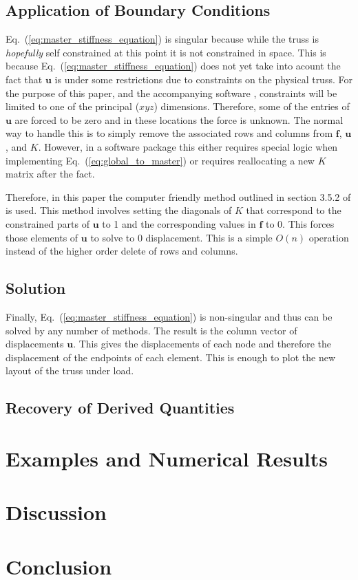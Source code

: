 \documentclass{article}
\begin{document}
\subsection{Application of Boundary Conditions}

Eq.~(\ref{eq:master_stiffness_equation}) is singular because while the truss
is \emph{hopefully} self constrained at this point it is not constrained in
space.  This is because Eq.~(\ref{eq:master_stiffness_equation}) does not yet
take into acount the fact that $\mathbf{u}$ is under some restrictions due to
constraints on the physical truss.  For the purpose of this paper, and the
accompanying software \parencite{shannon2016}, constraints will be limited to
one of the principal ($xyz$) dimensions.  Therefore, some of the entries of
$\mathbf{u}$ are forced to be zero and in these locations the force is
unknown.  The normal way to handle this is to simply remove the associated
rows and columns from $\mathbf{f}$, $\mathbf{u}$, and $K$.  However, in a
software package this either requires special logic when implementing
Eq.~(\ref{eq:global_to_master}) or requires reallocating a new $K$ matrix
after the fact.

Therefore, in this paper the computer friendly method outlined in section
3.5.2 of \cite{felippa2004ch3} is used.  This method involves setting the
diagonals of $K$ that correspond to the constrained parts of $\mathbf{u}$ to 1
and the corresponding values in $\mathbf{f}$ to 0.  This forces those elements
of $\mathbf{u}$ to solve to 0 displacement.  This is a simple $O(n)$ operation
instead of the higher order delete of rows and columns.




\subsection{Solution}

Finally, Eq.~(\ref{eq:master_stiffness_equation}) is non-singular and thus can
be solved by any number of methods.  The result is the column vector of
displacements $\mathbf{u}$.  This gives the displacements of each node and
therefore the displacement of the endpoints of each element.  This is enough
to plot the new layout of the truss under load.




\subsection{Recovery of Derived Quantities}






\section{Examples and Numerical Results}


\section{Discussion}


\section{Conclusion}


\printbibliography{}
\end{document}
